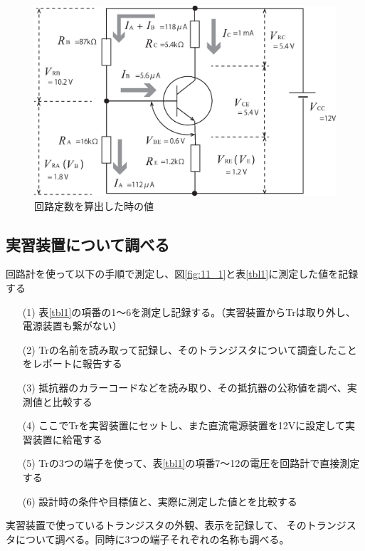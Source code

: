 \documentclass[uplatex,a4paper,11pt,oneside,openany]{jsbook}
\begin{document}
\begin{figure}[H]
  \centering
   \includegraphics[keepaspectratio, scale=0.45, angle=0]
               {figs/eps/p96fig3a.eps}
               \caption{回路定数を算出した時の値}
               \label{fig:11_2}
\end{figure}

\subsection{実習装置について調べる}

回路計を使って以下の手順で測定し、図\ref{fig:11_1}と表\ref{tbl1}に測定した値を記録する

\begin{enumerate}
\item[(1)] 表\ref{tbl1}の項番の1〜6を測定し記録する。（実習装置からTrは取り外し、電源装置も繋がない）
\item[(2)] Trの名前を読み取って記録し、そのトランジスタについて調査したことをレポートに報告する
\item[(3)] 抵抗器のカラーコードなどを読み取り、その抵抗器の公称値を調べ、実測値と比較する
\item[(4)] ここでTrを実習装置にセットし、また直流電源装置を12Vに設定して実習装置に給電する
\item[(5)] Trの3つの端子を使って、表\ref{tbl1}の項番7〜12の電圧を回路計で直接測定する
\item[(6)] 設計時の条件や目標値と、実際に測定した値とを比較する
\end{enumerate}

実習装置で使っているトランジスタの外観、表示を記録して、
そのトランジスタについて調べる。同時に3つの端子それぞれの名称も調べる。
\end{document}
